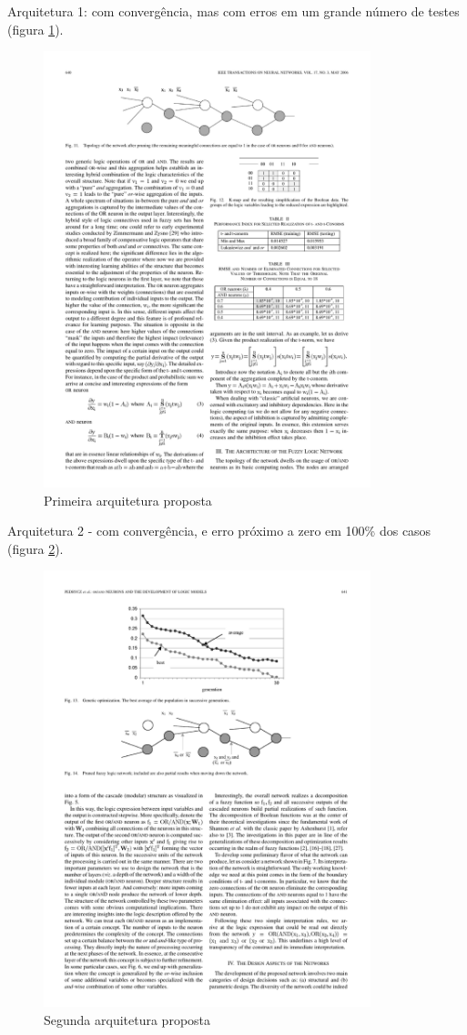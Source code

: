 \documentclass{IEEEtran}
\begin{document}
Arquitetura 1: com convergência,  mas com erros em um grande número de testes (figura \ref{arq1}).
\begin{figure}
	\centering
	\includegraphics[width=95mm]{arq1.pdf}
	\caption{Primeira arquitetura proposta}
	\label{arq1}
\end{figure}

Arquitetura 2  - com convergência, e erro próximo a zero em 100\% dos casos (figura \ref{arq2}). 
\begin{figure}
	\centering
	\includegraphics[width=95mm]{arq2.pdf}
	\caption{Segunda arquitetura proposta}
	\label{arq2}
\end{figure}
\end{document}
